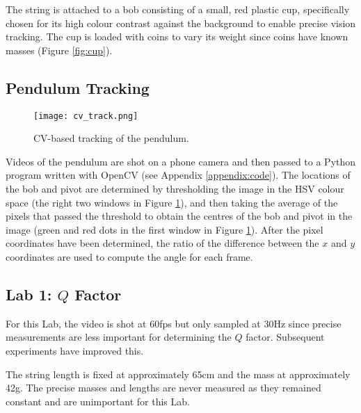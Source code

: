 \documentclass[aps,twocolumn,secnumarabic,nobalancelastpage,amsmath,amssymb,nofootinbib,floatfix,letterpaper]{revtex4}
\begin{document}
The string is attached to a bob consisting of a small, red plastic cup, specifically chosen for its high colour contrast
against the background to enable precise vision tracking. The cup is loaded with coins to vary its weight since coins
have known masses (Figure \ref{fig:cup}).

\subsection{Pendulum Tracking}
\label{sec:tracking}

\begin{figure}[htb]
    \centering
    \texttt{[image: cv\_track.png]}
    \caption{CV-based tracking of the pendulum.}
    \label{fig:tracking}
\end{figure}

Videos of the pendulum are shot on a phone camera and then passed to a Python program written with OpenCV (see Appendix
\ref{appendix:code}). The locations of the bob and pivot are determined by thresholding the image in the HSV colour
space (the right two windows in Figure \ref{fig:tracking}), and then taking the average of the pixels that passed the
threshold to obtain the centres of the bob and pivot in the image (green and red dots in the first window in Figure
\ref{fig:tracking}). After the pixel coordinates have been determined, the ratio of the difference between the \(x\) and
\(y\) coordinates are used to compute the angle for each frame.

\subsection{Lab 1: \texorpdfstring{\(Q\)}{Q} Factor}
\label{sec:lab1_method}

For this Lab, the video is shot at 60fps but only sampled at 30Hz since precise measurements are less important for
determining the \(Q\) factor. Subsequent experiments have improved this.

The string length is fixed at approximately 65cm and the mass at approximately 42g. The precise masses and lengths are
never measured as they remained constant and are unimportant for this Lab.
\end{document}
